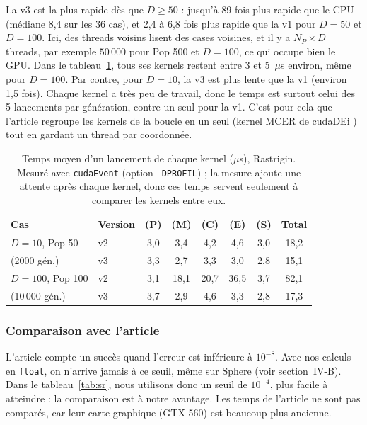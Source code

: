 \documentclass[conference]{IEEEtran}
\begin{document}
La v3 est la plus rapide d\`es que $D\ge50$ : jusqu'\`a 89 fois plus rapide que le CPU (m\'ediane 8,4 sur les 36 cas), et 2,4 \`a 6,8 fois plus rapide que la v1 pour $D=50$ et $D=100$. Ici, des threads voisins lisent des cases voisines, et il y a $N_P\times D$ threads, par exemple $50\,000$ pour Pop 500 et $D=100$, ce qui occupe bien le GPU. Dans le tableau~\ref{tab:profil}, tous ses kernels restent entre 3 et 5~$\mu$s environ, m\^eme pour $D=100$. Par contre, pour $D=10$, la v3 est plus lente que la v1 (environ 1,5 fois). Chaque kernel a tr\`es peu de travail, donc le temps est surtout celui des 5 lancements par g\'en\'eration, contre un seul pour la v1. C'est pour cela que l'article regroupe les kernels de la boucle en un seul (kernel MCER de cudaDEi \cite{qin}) tout en gardant un thread par coordonn\'ee.

\begin{table}[!t]\centering\scriptsize\setlength{\tabcolsep}{3pt}
\caption{Temps moyen d'un lancement de chaque kernel ($\mu$s), Rastrigin. Mesur\'e avec \texttt{cudaEvent} (option \texttt{-DPROFIL}) ; la mesure ajoute une attente apr\`es chaque kernel, donc ces temps servent seulement \`a comparer les kernels entre eux.}\label{tab:profil}
\begin{tabular}{ll|ccccc|c}\toprule Cas & Version & (P) & (M) & (C) & (E) & (S) & Total\\\midrule
$D{=}10$, Pop 50  & v2 & 3,0 & 3,4 & 4,2 & 4,6 & 3,0 & 18,2\\
(2000 g\'en.)       & v3 & 3,3 & 2,7 & 3,3 & 3,0 & 2,8 & 15,1\\\midrule
$D{=}100$, Pop 100 & v2 & 3,1 & 18,1 & 20,7 & 36,5 & 3,7 & 82,1\\
(10\,000 g\'en.)    & v3 & 3,7 & 2,9 & 4,6 & 3,3 & 2,8 & 17,3\\
\bottomrule\end{tabular}\end{table}

\subsubsection{Comparaison avec l'article}
L'article \cite{qin} compte un succ\`es quand l'erreur est inf\'erieure \`a $10^{-8}$. Avec nos calculs en \texttt{float}, on n'arrive jamais \`a ce seuil, m\^eme sur Sphere (voir section~IV-B). Dans le tableau~\ref{tab:sr}, nous utilisons donc un seuil de $10^{-4}$, plus facile \`a atteindre : la comparaison est \`a notre avantage. Les temps de l'article ne sont pas compar\'es, car leur carte graphique (GTX 560) est beaucoup plus ancienne.
\end{document}
